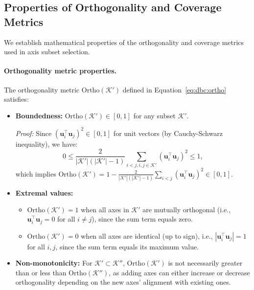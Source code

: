 \subsection{Properties of Orthogonality and Coverage Metrics}
\label{app:math_ortho_cover}

We establish mathematical properties of the orthogonality and coverage metrics used in axis subset selection.

\paragraph{Orthogonality metric properties.}
The orthogonality metric $\mathrm{Ortho}(\mathcal{K}')$ defined in Equation~\eqref{eq:dbc:ortho} satisfies:
\begin{itemize}
    \item \textbf{Boundedness:} $\mathrm{Ortho}(\mathcal{K}') \in [0, 1]$ for any subset $\mathcal{K}'$.
    
    \emph{Proof:} Since $(\mathbf{u}_i^\top \mathbf{u}_j)^2 \in [0, 1]$ for unit vectors (by Cauchy-Schwarz inequality), we have:
    \begin{equation}
    0 \leq \frac{2}{|\mathcal{K}'|(|\mathcal{K}'|-1)} \sum_{i<j, i,j \in \mathcal{K}'} (\mathbf{u}_i^\top \mathbf{u}_j)^2 \leq 1,
    \end{equation}
    which implies $\mathrm{Ortho}(\mathcal{K}') = 1 - \frac{2}{|\mathcal{K}'|(|\mathcal{K}'|-1)} \sum_{i<j} (\mathbf{u}_i^\top \mathbf{u}_j)^2 \in [0, 1]$.
    
    \item \textbf{Extremal values:} 
    \begin{itemize}
        \item $\mathrm{Ortho}(\mathcal{K}') = 1$ when all axes in $\mathcal{K}'$ are mutually orthogonal (i.e., $\mathbf{u}_i^\top \mathbf{u}_j = 0$ for all $i \neq j$), since the sum term equals zero.
        \item $\mathrm{Ortho}(\mathcal{K}') = 0$ when all axes are identical (up to sign), i.e., $|\mathbf{u}_i^\top \mathbf{u}_j| = 1$ for all $i, j$, since the sum term equals its maximum value.
\end{itemize}
    
    \item \textbf{Non-monotonicity:} For $\mathcal{K}' \subset \mathcal{K}''$, $\mathrm{Ortho}(\mathcal{K}')$ is not necessarily greater than or less than $\mathrm{Ortho}(\mathcal{K}'')$, as adding axes can either increase or decrease orthogonality depending on the new axes' alignment with existing ones.
\end{itemize}

